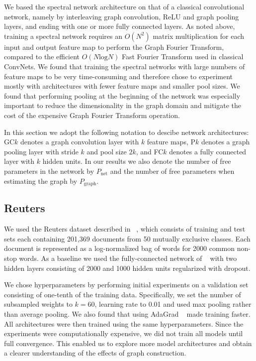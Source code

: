We based the spectral network architecture on that of a classical convolutional network, namely by interleaving graph convolution, ReLU and graph pooling layers, and ending with one or more fully connected layers. As noted above, training a spectral network requires an $O(N^2)$ matrix multiplication for each input and output feature map to perform the Graph Fourier Transform, compared to the efficient $O(N \text{log} N)$ Fast Fourier Transform used in classical ConvNets. We found that training the spectral networks with large numbers of feature maps to be very time-consuming and therefore chose to experiment mostly with architectures with fewer feature maps and smaller pool sizes. We found that performing pooling at the beginning of the network was especially important to reduce the dimensionality in the graph domain and mitigate the cost of the expensive Graph Fourier Transform operation.

In this section we adopt the following notation to descibe network architectures: GC$k$ denotes a graph convolution layer with $k$ feature maps, P$k$ denotes a graph pooling layer with stride $k$ and pool size $2k$, and FC$k$ denotes a fully connected layer with $k$ hidden units. In our results we also denote the number of free parameters in the network by $P_\text{net}$ and the number of free parameters when estimating the graph by $P_\text{graph}$.

\subsection{Reuters}

We used the Reuters dataset described in ~\cite{JMLR:v15:srivastava14a}, which consists of training and test sets each containing 201,369 documents from 50 mutually exclusive classes. Each document is represented as a log-normalized bag of words for 2000 common non-stop words. As a baseline we used the fully-connected network of ~\cite{JMLR:v15:srivastava14a} with two hidden layers consisting of 2000 and 1000 hidden units regularized with dropout.  

 We chose hyperparameters by performing initial experiments on a validation set consisting of one-tenth of the training data. Specifically, we set the number of subsampled weights to $k=60$, learning rate to 0.01 and used max pooling rather than average pooling. We also found that using AdaGrad ~\cite{adagrad} made training faster. All architectures were then trained using the same hyperparameters.
Since the experiments were computationally expensive, we did not train all models until full convergence. This enabled us to explore more model architectures and obtain a clearer understanding of the effects of graph construction.  

